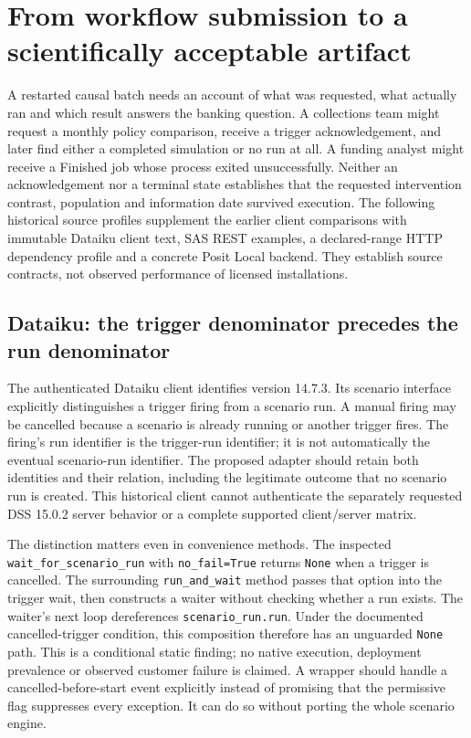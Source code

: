 \section{From workflow submission to a scientifically acceptable artifact}
\label{sec:exec24-workflow-contracts}

A restarted causal batch needs an account of what was requested, what
actually ran and which result answers the banking question. A collections
team might request a monthly policy comparison, receive a trigger
acknowledgement, and later find either a completed simulation or no run at
all. A funding analyst might receive a Finished job whose process exited
unsuccessfully. Neither an acknowledgement nor a terminal state establishes
that the requested intervention contrast, population and information date
survived execution. The following historical source profiles supplement the
earlier client comparisons with immutable Dataiku client text, SAS REST
examples, a declared-range HTTP dependency profile and a concrete Posit
Local backend. They establish source contracts, not observed performance of
licensed installations.\citep{exec24_workflow_contracts_dataiku,
exec24_workflow_contracts_sas,exec24_workflow_contracts_domino,
exec24_workflow_contracts_posit}

\subsection{Dataiku: the trigger denominator precedes the run denominator}

The authenticated Dataiku client identifies version 14.7.3. Its scenario
interface explicitly distinguishes a trigger firing from a scenario run.
A manual firing may be cancelled because a scenario is already running or
another trigger fires. The firing's run identifier is the trigger-run
identifier; it is not automatically the eventual scenario-run identifier.
The proposed adapter should retain both identities and their relation,
including the legitimate outcome that no scenario run is created. This
historical client cannot authenticate the separately requested DSS 15.0.2
server behavior or a complete supported client/server matrix.
\citep{exec24_workflow_contracts_dataiku}

The distinction matters even in convenience methods. The inspected
\texttt{wait\_for\_scenario\_run} with \texttt{no\_fail=True} returns \texttt{None}
when a trigger is cancelled. The surrounding \texttt{run\_and\_wait}
method passes that option into the trigger wait, then constructs a waiter
without checking whether a run exists. The waiter's next loop dereferences
\texttt{scenario\_run.run}. Under the documented cancelled-trigger
condition, this composition therefore has an unguarded \texttt{None} path.
This is a conditional static finding; no native execution, deployment
prevalence or observed customer failure is claimed. A wrapper should handle
a cancelled-before-start event explicitly instead of promising that the
permissive flag suppresses every exception. It can do so without porting
the whole scenario engine.\citep{exec24_workflow_contracts_dataiku}

